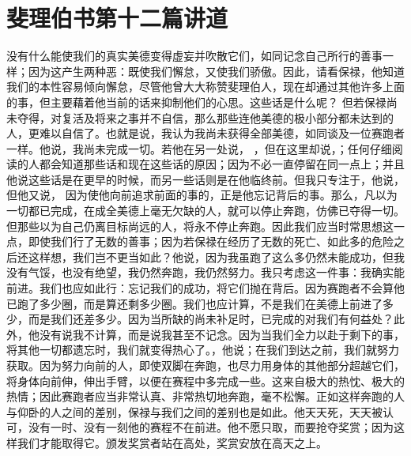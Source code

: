 

\section{斐理伯书第十二篇讲道}

\par

\par

没有什么能使我们的真实美德变得虚妄并吹散它们，如同记念自己所行的善事一样；因为这产生两种恶：既使我们懈怠，又使我们骄傲。因此，请看保禄，他知道我们的本性容易倾向懈怠，尽管他曾大大称赞斐理伯人，现在却通过其他许多上面的事，但主要藉着他当前的话来抑制他们的心思。这些话是什么呢？ 但若保禄尚未夺得，对复活及将来之事并不自信，那么那些连他美德的极小部分都未达到的人，更难以自信了。也就是说，我认为我尚未获得全部美德，如同谈及一位赛跑者一样。他说，我尚未完成一切。若他在另一处说， ，但在这里却说，；任何仔细阅读的人都会知道那些话和现在这些话的原因；因为不必一直停留在同一点上；并且他说这些话是在更早的时候，而另一些话则是在他临终前。但我只专注于，他说， 但他又说， 因为使他向前追求前面的事的，正是他忘记背后的事。那么，凡以为一切都已完成，在成全美德上毫无欠缺的人，就可以停止奔跑，仿佛已夺得一切。但那些以为自己仍离目标尚远的人，将永不停止奔跑。因此我们应当时常思想这一点，即使我们行了无数的善事；因为若保禄在经历了无数的死亡、如此多的危险之后还这样想，我们岂不更当如此？他说，因为我虽跑了这么多仍然未能成功，但我没有气馁，也没有绝望，我仍然奔跑，我仍然努力。我只考虑这一件事：我确实能前进。我们也应如此行：忘记我们的成功，将它们抛在背后。因为赛跑者不会算他已跑了多少圈，而是算还剩多少圈。我们也应计算，不是我们在美德上前进了多少，而是我们还差多少。因为当所缺的尚未补足时，已完成的对我们有何益处？此外，他没有说我不计算，而是说我甚至不记念。因为当我们全力以赴于剩下的事，将其他一切都遗忘时，我们就变得热心了。，他说；在我们到达之前，我们就努力获取。因为努力向前的人，即使双脚在奔跑，也尽力用身体的其他部分超越它们，将身体向前伸，伸出手臂，以便在赛程中多完成一些。这来自极大的热忱、极大的热情；因此赛跑者应当非常认真、非常热切地奔跑，毫不松懈。正如这样奔跑的人与仰卧的人之间的差别，保禄与我们之间的差别也是如此。他天天死，天天被认可，没有一时、没有一刻他的赛程不在前进。他不愿只取，而要抢夺奖赏；因为这样我们才能取得它。颁发奖赏者站在高处，奖赏安放在高天之上。\par


